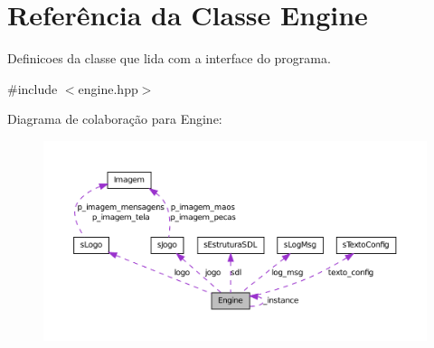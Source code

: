 \hypertarget{classEngine}{
\section{Referência da Classe Engine}
\label{classEngine}
}


Definicoes da classe que lida com a interface do programa.  




{\ttfamily \#include $<$engine.hpp$>$}



Diagrama de colaboração para Engine:\nopagebreak
\begin{figure}[H]
\begin{center}
\leavevmode
\includegraphics[width=400pt]{classEngine__coll__graph}
\end{center}
\end{figure}
